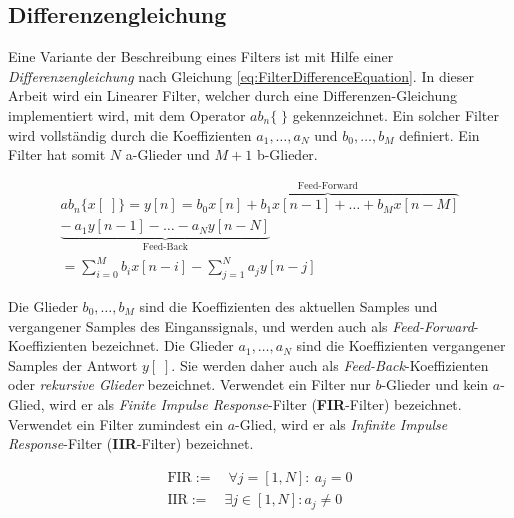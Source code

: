\subsection{Differenzengleichung}
\label{sec:differenzengleichung}

Eine Variante der Beschreibung eines Filters ist mit Hilfe einer \emph{Differenzengleichung} nach Gleichung \ref{eq:FilterDifferenceEquation}. In dieser Arbeit wird ein Linearer Filter, welcher durch eine Differenzen-Gleichung implementiert wird, mit dem Operator $ab_n\{\;\}$ gekennzeichnet. Ein solcher Filter wird vollständig durch die Koeffizienten $a_1 ,\ldots, a_N$ und $b_0 ,\ldots, b_M$  definiert. Ein Filter hat somit $N$ a-Glieder und $M+1$ b-Glieder.  \cite[\glqq Difference Equation\grqq]{introductionToFilters}

 \begin{equation}
\begin{split}
ab_n\{x[\;]\}= y[n] = \overbrace{b_0 x[n] + b_1 x[n-1] + \ldots +b_M x[n-M]}^\text{Feed-Forward} \\
\underbrace{-\ a_1 y[n-1] - \ldots - a_N y[n-N]}_\text{Feed-Back} \\
 = \sum_{i=0}^{M} b_i x[n-i] - \sum_{j=1}^{N} a_j y[n-j]
\end{split}
\label{eq:FilterDifferenceEquation}
\end{equation}

Die Glieder $b_0 ,\ldots, b_M$ sind die Koeffizienten des aktuellen Samples und vergangener Samples des Einganssignals, und werden auch als \emph{Feed-Forward}-Koeffizienten bezeichnet. Die Glieder $a_1 ,\ldots, a_N$ sind die Koeffizienten vergangener Samples der Antwort $y[\;]$. Sie werden daher auch als \emph{Feed-Back}-Koeffizienten oder \emph{rekursive Glieder} bezeichnet. Verwendet ein Filter nur $b$-Glieder und kein $a$-Glied, wird er als \emph{Finite Impulse Response}-Filter (\textbf{FIR}-Filter) bezeichnet. Verwendet ein Filter zumindest ein $a$-Glied, wird er als \emph{Infinite Impulse Response}-Filter (\textbf{IIR}-Filter) bezeichnet.\cite[\glqq Difference Equation\grqq]{introductionToFilters}

 \begin{equation}
\begin{gathered}
\text{FIR} := \quad \forall j = [1,N] :\ a_j = 0 \\
\text{IIR} := \quad \exists j \in [1,N]:  a_j \neq 0
\end{gathered}
\label{eq:FIRvsIIR}
\end{equation}

